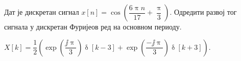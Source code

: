 \PID \label{z:DTFS_sin}
Дат је дискретан сигнал 
$x[n] = \cos \left(
    \dfrac{6\uppi n}{17}  + \dfrac{\uppi}{3}
\right)$. Одредити развој тог сигнала у дискретан Фуријеов ред на основном периоду. 
\vspace*{2mm}

\textsc{}
$X[k] = \dfrac{1}{2}
\left(
    \exp\left( 
        \dfrac{\jj\uppi}{3}
     \right)
     \updelta[k-3] 
     +
     \exp\left( 
        \dfrac{-\jj\uppi}{3}
     \right)
     \updelta[k+3]
\right)$.